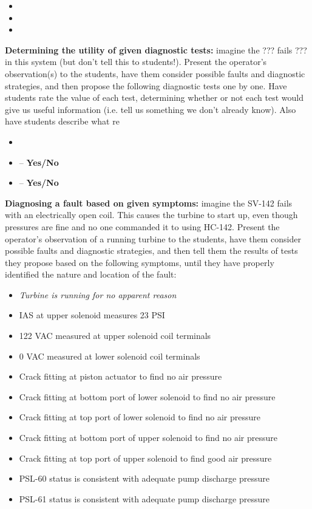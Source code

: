 \begin{itemize}
\item{} 
\item{} 
\item{} 
\end{itemize}


\vskip 10pt


\noindent
{\bf Determining the utility of given diagnostic tests:} imagine the ??? fails ??? in this system (but don't tell this to students!).  Present the operator's observation(s) to the students, have them consider possible faults and diagnostic strategies, and then propose the following diagnostic tests one by one.  Have students rate the value of each test, determining whether or not each test would give us useful information (i.e. tell us something we don't already know).  Also have students describe what re

\begin{itemize}
\item{} {\it }
\item{}  -- {\bf Yes/No}
\item{}  -- {\bf Yes/No}
\end{itemize}


\vskip 10pt


\noindent
{\bf Diagnosing a fault based on given symptoms:} imagine the SV-142 fails with an electrically open coil.  This causes the turbine to start up, even though pressures are fine and no one commanded it to using HC-142.  Present the operator's observation of a running turbine to the students, have them consider possible faults and diagnostic strategies, and then tell them the results of tests they propose based on the following symptoms, until they have properly identified the nature and location of the fault:

\begin{itemize}
\item{} {\it Turbine is running for no apparent reason}
\item{} IAS at upper solenoid measures 23 PSI
\item{} 122 VAC measured at upper solenoid coil terminals
\item{} 0 VAC measured at lower solenoid coil terminals
\item{} Crack fitting at piston actuator to find no air pressure
\item{} Crack fitting at bottom port of lower solenoid to find no air pressure
\item{} Crack fitting at top port of lower solenoid to find no air pressure
\item{} Crack fitting at bottom port of upper solenoid to find no air pressure
\item{} Crack fitting at top port of upper solenoid to find good air pressure
\item{} PSL-60 status is consistent with adequate pump discharge pressure
\item{} PSL-61 status is consistent with adequate pump discharge pressure
\end{itemize}





